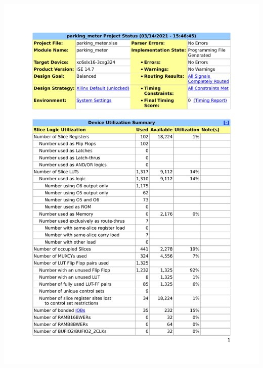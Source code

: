 \documentclass{article}
\begin{document}
{\centering\includegraphics[scale=0.8, page=2]{../figs/summary.pdf}\par}
\end{document}
